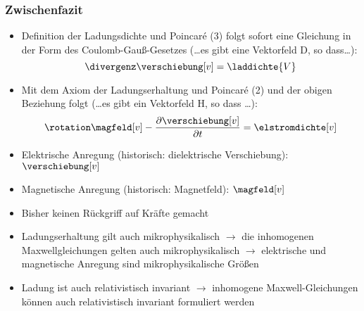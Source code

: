 \begin{frame}
  \frametitle{Zwischenfazit}
\begin{itemize}[<+->]
\item Definition der Ladungsdichte und Poincaré (3) folgt sofort eine Gleichung in der Form des Coulomb-Gauß-Gesetzes (\dots es gibt eine Vektorfeld D, so dass\dots):
  \begin{equation*}
    \divergenz\verschiebung[v]=\laddichte{V}
\end{equation*}
  
\item Mit dem Axiom der Ladungserhaltung und Poincaré (2) und der obigen Beziehung folgt (\dots es gibt ein Vektorfeld H, so dass \dots ):
  \begin{equation*}
    \rotation\magfeld[v] - \frac{\partial \verschiebung[v]}{\partial t} = \elstromdichte[v]
\end{equation*}
  
\item Elektrische Anregung (historisch: dielektrische Verschiebung): \(\verschiebung[v] \)
\item Magnetische Anregung (historisch: Magnetfeld): \(\magfeld[v] \) 
\item Bisher keinen Rückgriff auf Kräfte gemacht
\item Ladungserhaltung gilt auch mikrophysikalisch \(\to\) die inhomogenen Maxwellgleichungen gelten auch mikrophysikalisch \(\to\) elektrische und magnetische Anregung sind mikrophysikalische Größen
\item Ladung ist auch relativistisch invariant \(\to\) inhomogene Maxwell-Gleichungen können auch relativistisch invariant formuliert werden
\end{itemize}
\end{frame}


